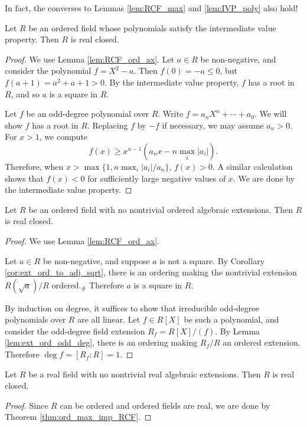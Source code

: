 In fact, the converses to Lemmas \ref{lem:RCF_max} and \ref{lem:IVP_poly} also hold!

\begin{theorem}
  \label{thm:IVP_poly_imp_RCF}
  \leanok
  Let $R$ be an ordered field whose polynomials satisfy the intermediate value property. Then $R$ is real closed.
\end{theorem}
\begin{proof}
  \leanok
  We use Lemma \ref{lem:RCF_ord_ax}. Let $a\in R$ be non-negative, and consider the polynomial $f=X^2-a$. Then $f(0)=-a\leq0$, but $f(a+1)=a^2+a+1>0$. By the intermediate value property, $f$ has a root in $R$, and so $a$ is a square in $R$.

  Let $f$ be an odd-degree polynomial over $R$. Write $f=a_nX^n+\cdots+a_0$. We will show $f$ has a root in $R$. Replacing $f$ by $-f$ if necessary, we may assume $a_n>0$. For $x>1$, we compute
  \[f(x)\geq x^{n-1}(a_nx-n\max_i|a_i|).\]
  Therefore, when $x>\max\{1,n\max_i|a_i|/a_n\}$, $f(x)>0$. A similar calculation shows that $f(x)<0$ for sufficiently large negative values of $x$. We are done by the intermediate value property.
\end{proof}

\begin{theorem}
  \label{thm:ord_max_imp_RCF}
  \leanok
  Let $R$ be an ordered field with no nontrivial ordered algebraic extensions. Then $R$ is real closed.
\end{theorem}
\begin{proof}
  \leanok
  We use Lemma \ref{lem:RCF_ord_ax}. 

  Let $a\in R$ be non-negative, and suppose $a$ is not a square. By Corollary \ref{cor:ext_ord_to_adj_sqrt}, there is an ordering making the nontrivial extension $R(\sqrt{a})/R$ ordered.$_\#$ Therefore $a$ is a square in $R$.

  By induction on degree, it suffices to show that irreducible odd-degree polynomials over $R$ are all linear. Let $f\in R[X]$ be such a polynomial, and consider the odd-degree field extension $R_f=R[X]/(f)$. By Lemma \ref{lem:ext_ord_odd_deg}, there is an ordering making $R_f/R$ an ordered extension. Therefore $\deg f=[R_f:R]=1$.
\end{proof}

\begin{corollary}
  \label{cor:real_max_imp_RCF}
  \leanok
  Let $R$ be a real field with no nontrivial real algebraic extensions. Then $R$ is real closed.
\end{corollary}
\begin{proof}
  \leanok
  Since $R$ can be ordered and ordered fields are real, we are done by Theorem \ref{thm:ord_max_imp_RCF}.
\end{proof}

